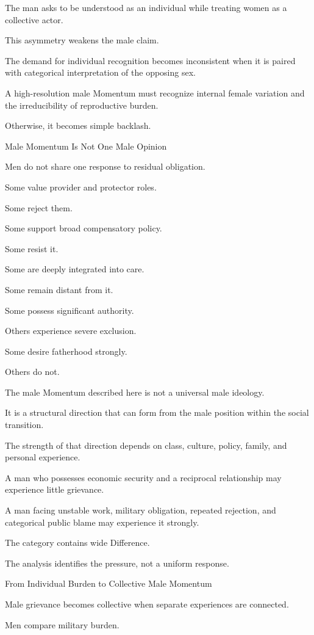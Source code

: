 The man asks to be understood as an individual while treating women as a collective actor.

This asymmetry weakens the male claim.

The demand for individual recognition becomes inconsistent when it is paired with categorical interpretation of the opposing sex.

A high-resolution male Momentum must recognize internal female variation and the irreducibility of reproductive burden.

Otherwise, it becomes simple backlash.

Male Momentum Is Not One Male Opinion

Men do not share one response to residual obligation.

Some value provider and protector roles.

Some reject them.

Some support broad compensatory policy.

Some resist it.

Some are deeply integrated into care.

Some remain distant from it.

Some possess significant authority.

Others experience severe exclusion.

Some desire fatherhood strongly.

Others do not.

The male Momentum described here is not a universal male ideology.

It is a structural direction that can form from the male position within the social transition.

The strength of that direction depends on class, culture, policy, family, and personal experience.

A man who possesses economic security and a reciprocal relationship may experience little grievance.

A man facing unstable work, military obligation, repeated rejection, and categorical public blame may experience it strongly.

The category contains wide Difference.

The analysis identifies the pressure, not a uniform response.

From Individual Burden to Collective Male Momentum

Male grievance becomes collective when separate experiences are connected.

Men compare military burden.

